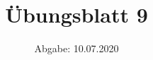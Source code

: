 

\subject{Computational Physics}
\title{Übungsblatt 9}
\date{%
  Abgabe: 10.07.2020
}



\maketitle
\thispagestyle{empty}
\newpage



%
%



